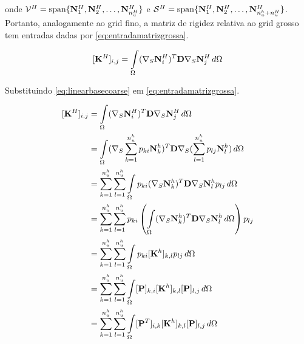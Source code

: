 onde $\trialcoarseaprox =  \text{span}\{ \basefunctioncoarse[1], \basefunctioncoarse[2], \hdots, \basefunctioncoarse[\qtdfreedomcoarse] \}$ e $\testcoarseaprox =  \text{span}\{ \basefunctioncoarse[1], \basefunctioncoarse[2], \hdots, \basefunctioncoarse[\qtdfreedomfine + \qtdfreedomcoarse] \}$. Portanto, analogamente ao grid fino,  a matriz de rigidez relativa ao grid grosso tem entradas dadas por \eqref{eq:entradamatrizgrossa}.

\begin{equation} \label{eq:entradamatrizgrossa}
    \rigidmatrixcoarseentry = \omeint{(\sopnabla \basefunctioncoarse[i])^T \mathbf{D} \sopnabla \basefunctioncoarse[j]}
\end{equation}

Substituindo \eqref{eq:linearbasecoarse} em \eqref{eq:entradamatrizgrossa}.


\begin{align}
     \rigidmatrixcoarseentry  & =   \omeint{(\sopnabla \basefunctioncoarse[i])^T \mathbf{D} \sopnabla \basefunctioncoarse[j]} \nonumber \\
                & =   \omeint{(\sopnabla  \sum_{k=1}^{\qtdfreedomfine} p_{ki} \basefunctionfine[k])^T \mathbf{D} \sopnabla( \sum_{l=1}^{\qtdfreedomfine} p_{lj} \basefunctionfine[l] )}  \nonumber \\
                & =    \sum_{k=1}^{\qtdfreedomfine}  \sum_{l=1}^{\qtdfreedomfine} \omeint{p_{ki} ( \sopnabla \basefunctionfine[k])^T \mathbf{D} \sopnabla \basefunctionfine[l] p_{lj}  }                  \nonumber \\
                & =    \sum_{k=1}^{\qtdfreedomfine}  \sum_{l=1}^{\qtdfreedomfine} p_{ki} \left( \omeint{ ( \sopnabla \basefunctionfine[k])^T \mathbf{D} \sopnabla \basefunctionfine[l]   } \right)p_{lj}                            \nonumber \\
                & = \sum_{k=1}^{\qtdfreedomfine}  \sum_{l=1}^{\qtdfreedomfine} \omeint{     p_{ki} [\rigidmatrix]_{k,l} p_{lj}}  \nonumber \\
                & = \sum_{k=1}^{\qtdfreedomfine}  \sum_{l=1}^{\qtdfreedomfine} \omeint{   [\mathbf{P}]_{k,i} [\rigidmatrix]_{k,l} [\mathbf{P}]_{l,j}}                                         \nonumber \\
                & = \sum_{k=1}^{\qtdfreedomfine}  \sum_{l=1}^{\qtdfreedomfine} \omeint{   [\mathbf{P}^T]_{i,k} [\rigidmatrix]_{k,l} [\mathbf{P}]_{l,j}     }   \label{eq:ptapeinstein}  
\end{align}


